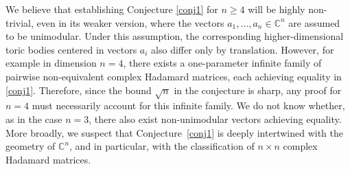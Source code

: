 \documentclass[12pt, a4paper]{article}
\theoremstyle{plain} %
\theoremstyle{definition} %
\theoremstyle{remark} %
\begin{document}
We believe that establishing Conjecture \eqref{conj1} for $n \geq 4$ will be highly non-trivial, even in its weaker version, where the vectors $a_1, \ldots, a_n \in \mathbb{C}^n$ are assumed to be unimodular. Under this assumption, the corresponding higher-dimensional toric bodies centered in vectors $a_i$ also differ only by translation. However, for example in dimension $n=4$, there exists a one-parameter infinite family of pairwise non-equivalent complex Hadamard matrices, each achieving equality in \eqref{conj1}. Therefore, since the bound $\sqrt{n}$ in the conjecture is sharp, any proof for $n=4$ must necessarily account for this infinite family. We do not know whether, as in the case $n=3$, there also exist non-unimodular vectors achieving equality. More broadly, we suspect that Conjecture~\ref{conj1} is deeply intertwined with the geometry of $\mathbb{C}^n$, and in particular, with the classification of $n \times n$ complex Hadamard matrices.
\end{document}
